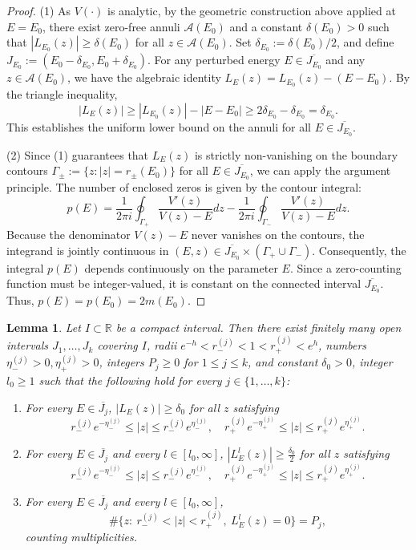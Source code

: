 \documentclass[reqno,11pt]{amsart}
\newtheorem{lemma}{Lemma}[section]
\begin{document}
\begin{proof}
(1) As $V(\cdot)$ is analytic, by the geometric construction above  applied at $E = E_0$, there exist zero-free annuli $\mathcal{A}(E_0)$ and a constant $\delta(E_0) > 0$ such that $|L_{E_0}^{}(z)| \ge \delta(E_0)$ for all $z \in \mathcal{A}(E_0)$. 
Set $\delta_{E_0} := \delta(E_0)/2$, and define $J_{E_0} := (E_0 - \delta_{E_0}, E_0 + \delta_{E_0})$. For any perturbed energy $E \in \overline{J_{E_0}}$ and any $z \in \mathcal{A}(E_0)$, we have the algebraic identity $L_{E}^{}(z) = L_{E_0}^{}(z) - (E - E_0)$. By the  triangle inequality,
$$
|L_{E}^{}(z)| \ge |L_{E_0}^{}(z)| - |E-E_0| \ge 2\delta_{E_0} - \delta_{E_0} = \delta_{E_0}.
$$
This establishes the uniform lower bound on the annuli for all $E \in \overline{J_{E_0}}$.

(2) Since  (1) guarantees that $L_{E}^{}(z)$ is strictly non-vanishing on the boundary contours $\Gamma_\pm := \{z : |z|=r_\pm(E_0)\}$ for all $E \in \overline{J_{E_0}}$, we can apply the argument principle. The number of enclosed zeros is given by the contour integral:
\begin{equation*}
   p(E) = \frac{1}{2\pi i}\oint_{\Gamma_+} \frac{V'(z)}{V(z)-E} dz - \frac{1}{2\pi i}\oint_{\Gamma_-} \frac{V'(z)}{V(z)-E} dz.
\end{equation*}
Because the denominator $V(z)-E$ never vanishes on the contours, the integrand is jointly continuous in $(E, z) \in \overline{J_{E_0}} \times (\Gamma_+ \cup \Gamma_-)$. Consequently, the integral $p(E)$ depends continuously on the parameter $E$. Since a zero-counting function must be integer-valued, it is  constant on the connected interval $\overline{J_{E_0}}$. Thus, $p(E) = p(E_0) = 2m(E_0)$.
\end{proof}



\begin{lemma}\label{prop:assume}
Let $I\subset\mathbb R$ be a compact interval. Then there exist finitely many open intervals $J_1,\dots,J_k$ covering $I$, radii $e^{-h}<r_-^{(j)}<1<r_+^{(j)}<e^h$, numbers $\eta_-^{(j)}>0,\eta_+^{(j)}>0$, integers $P_j\ge 0$ for $1\leq j\leq k$, and constant $\delta_0>0$,   integer $l_0\ge 1$ such that the following hold for every $j\in\{1,\dots,k\}$:

\begin{enumerate}
    \item For every $E\in \overline{J_j}$, $|L_{E}^{}(z)|\ge \delta_0$ for all $z$ satisfying 
    $$
    r_-^{(j)}e^{-\eta_-^{(j)}}\le |z|\le r_-^{(j)}e^{\eta_-^{(j)}},\quad r_+^{(j)}e^{-\eta_+^{(j)}}\le |z|\le r_+^{(j)}e^{\eta_+^{(j)}}.
    $$
    \item For every $E\in \overline{J_j}$ and every $l\in [l_0,\infty]$, $|L^{l}_{E}(z)|\ge \frac{\delta_0}{2}$ for all $z$ satisfying 
    $$
    r_-^{(j)}e^{-\eta_-^{(j)}}\le |z|\le r_-^{(j)}e^{\eta_-^{(j)}}, \quad r_+^{(j)}e^{-\eta_+^{(j)}}\le |z|\le r_+^{(j)}e^{\eta_+^{(j)}}.
    $$
    \item For every $E\in \overline{J_j}$ and every $l\in [l_0,\infty]$,
    $$
    \#\{z:\ r_-^{(j)}<|z|<r_+^{(j)},\ L^{l}_{E}(z)=0\}=P_j,
    $$
    counting multiplicities.
\end{enumerate}
\end{lemma}
\end{document}

